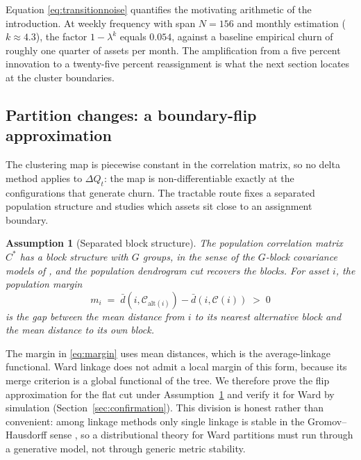 \documentclass{rQUF2e}
\theoremstyle{plain}
\newtheorem{assumption}{Assumption}
\theoremstyle{remark}
\begin{document}
Equation \eqref{eq:transitionnoise} quantifies the motivating arithmetic of
the introduction. At weekly frequency with span $N=156$ and monthly estimation
($k \approx 4.3$), the factor $1-\lambda^{k}$ equals $0.054$, against a
baseline empirical churn of roughly one quarter of assets per month. The
amplification from a five percent innovation to a twenty-five percent
reassignment is what the next section locates at the cluster boundaries.

\subsection{Partition changes: a boundary-flip approximation}

The clustering map is piecewise constant in the correlation matrix, so no delta
method applies to $\Delta Q_t$: the map is non-differentiable exactly at the
configurations that generate churn. The tractable route fixes a separated
population structure and studies which assets sit close to an assignment
boundary.

\begin{assumption}[Separated block structure]
\label{ass:block}
The population correlation matrix $C^{*}$ has a block structure with $G$
groups, in the sense of the $G$-block covariance models of
\citet{bunea2020model}, and the population dendrogram cut recovers the blocks.
For asset $i$, the population margin
\begin{equation}
m_i \;=\; \bar{d}\left(i, \mathcal{C}_{\mathrm{alt}(i)}\right)
- \bar{d}\left(i, \mathcal{C}(i)\right)
\;>\; 0
\label{eq:margin}
\end{equation}
is the gap between the mean distance from $i$ to its nearest alternative block
and the mean distance to its own block.
\end{assumption}

The margin in \eqref{eq:margin} uses mean distances, which is the
average-linkage functional. Ward linkage does not admit a local margin of this
form, because its merge criterion is a global functional of the tree. We
therefore prove the flip approximation for the flat cut under
Assumption~\ref{ass:block} and verify it for Ward by simulation
(Section~\ref{sec:confirmation}). This division is honest rather than
convenient: among linkage methods only single linkage is stable in the
Gromov--Hausdorff sense \citep{carlsson2010characterization}, so a
distributional theory for Ward partitions must run through a generative model,
not through generic metric stability.
\end{document}
